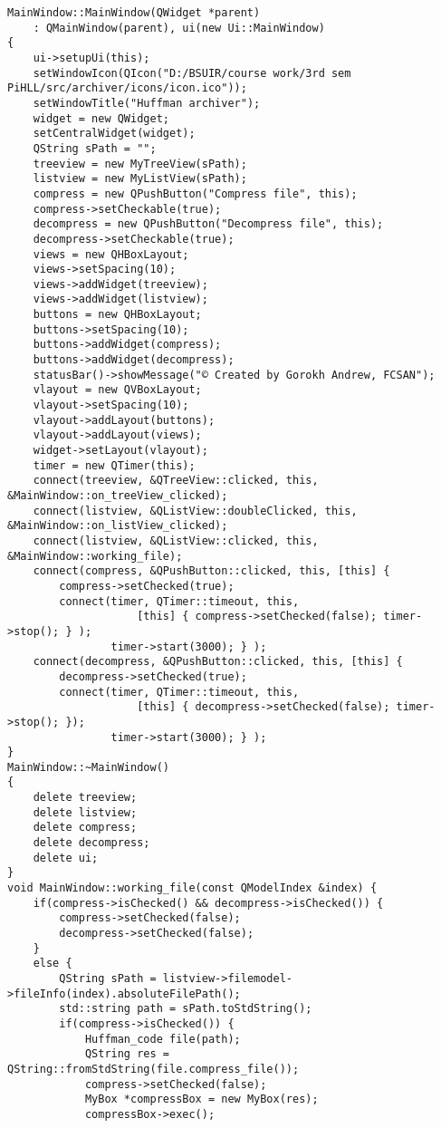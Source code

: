 \begin{verbatim}
MainWindow::MainWindow(QWidget *parent)
    : QMainWindow(parent), ui(new Ui::MainWindow)
{
    ui->setupUi(this);
    setWindowIcon(QIcon("D:/BSUIR/course work/3rd sem PiHLL/src/archiver/icons/icon.ico"));
    setWindowTitle("Huffman archiver");
    widget = new QWidget;
    setCentralWidget(widget);
    QString sPath = "";
    treeview = new MyTreeView(sPath);
    listview = new MyListView(sPath);
    compress = new QPushButton("Compress file", this);
    compress->setCheckable(true);
    decompress = new QPushButton("Decompress file", this);
    decompress->setCheckable(true);
    views = new QHBoxLayout;
    views->setSpacing(10);
    views->addWidget(treeview);
    views->addWidget(listview);
    buttons = new QHBoxLayout;
    buttons->setSpacing(10);
    buttons->addWidget(compress);
    buttons->addWidget(decompress);
    statusBar()->showMessage("© Created by Gorokh Andrew, FCSAN");
    vlayout = new QVBoxLayout;
    vlayout->setSpacing(10);
    vlayout->addLayout(buttons);
    vlayout->addLayout(views);
    widget->setLayout(vlayout);
    timer = new QTimer(this);
    connect(treeview, &QTreeView::clicked, this, &MainWindow::on_treeView_clicked);
    connect(listview, &QListView::doubleClicked, this, &MainWindow::on_listView_clicked);
    connect(listview, &QListView::clicked, this, &MainWindow::working_file);
    connect(compress, &QPushButton::clicked, this, [this] {
        compress->setChecked(true);
        connect(timer, QTimer::timeout, this,
                    [this] { compress->setChecked(false); timer->stop(); } );
                timer->start(3000); } );
    connect(decompress, &QPushButton::clicked, this, [this] {
        decompress->setChecked(true);
        connect(timer, QTimer::timeout, this,
                    [this] { decompress->setChecked(false); timer->stop(); });
                timer->start(3000); } );
}
MainWindow::~MainWindow()
{
    delete treeview;
    delete listview;
    delete compress;
    delete decompress;
    delete ui;
}
void MainWindow::working_file(const QModelIndex &index) {
    if(compress->isChecked() && decompress->isChecked()) {
        compress->setChecked(false);
        decompress->setChecked(false);
    }
    else {
        QString sPath = listview->filemodel->fileInfo(index).absoluteFilePath();
        std::string path = sPath.toStdString();
        if(compress->isChecked()) {
            Huffman_code file(path);
            QString res = QString::fromStdString(file.compress_file());
            compress->setChecked(false);
            MyBox *compressBox = new MyBox(res);
            compressBox->exec();

\end{verbatim}
